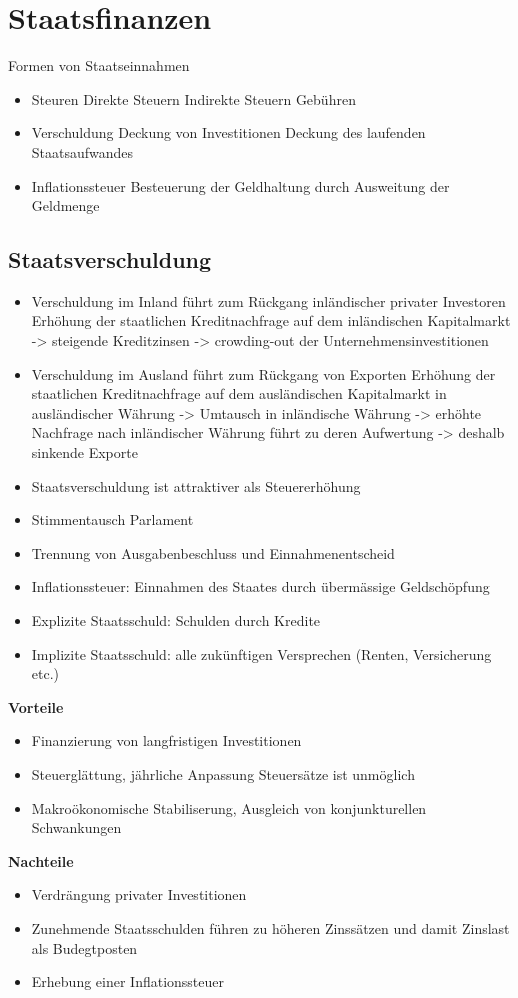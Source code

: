 \section{Staatsfinanzen}
Formen von Staatseinnahmen
\begin{itemize}
	\item Steuren
	\subitem Direkte Steuern
	\subitem Indirekte Steuern
	\subitem Gebühren
	\item Verschuldung
	\subitem Deckung von Investitionen
	\subitem Deckung des laufenden Staatsaufwandes
	\item Inflationssteuer
	\subitem Besteuerung der Geldhaltung durch Ausweitung der Geldmenge
\end{itemize}
\subsection{Staatsverschuldung}
\begin{itemize}
	\item Verschuldung im Inland führt zum Rückgang inländischer privater Investoren
	\subitem Erhöhung der staatlichen Kreditnachfrage auf dem inländischen Kapitalmarkt -> steigende Kreditzinsen -> crowding-out der Unternehmensinvestitionen
	\item Verschuldung im Ausland führt zum Rückgang von Exporten
	\subitem Erhöhung der staatlichen Kreditnachfrage auf dem ausländischen Kapitalmarkt in ausländischer Währung -> Umtausch in inländische Währung -> erhöhte Nachfrage nach inländischer Währung führt zu deren Aufwertung -> deshalb sinkende Exporte
	\item Staatsverschuldung ist attraktiver als Steuererhöhung
	\item Stimmentausch Parlament
	\item Trennung von Ausgabenbeschluss und Einnahmenentscheid
	\item Inflationssteuer: Einnahmen des Staates durch übermässige Geldschöpfung
	\item Explizite Staatsschuld: Schulden durch Kredite
	\item Implizite Staatsschuld: alle zukünftigen Versprechen (Renten, Versicherung etc.)
\end{itemize}
\begin{multicols}{2}
	\textbf{Vorteile}
	\begin{itemize}
		\item Finanzierung von langfristigen Investitionen
		\item Steuerglättung, jährliche Anpassung Steuersätze ist unmöglich
		\item Makroökonomische Stabiliserung, Ausgleich von konjunkturellen Schwankungen
	\end{itemize}
	\textbf{Nachteile}
	\begin{itemize}
		\item Verdrängung privater Investitionen
		\item Zunehmende Staatsschulden führen zu höheren Zinssätzen und damit Zinslast als Budegtposten
		\item Erhebung einer Inflationssteuer
	\end{itemize}
\end{multicols}
